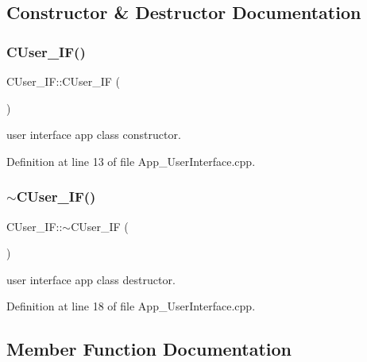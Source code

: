 \subsection{Constructor \& Destructor Documentation}
\mbox{\label{class_c_user___i_f_a417b492fc7368c7d5dde59587f4b3e65}} 
\subsubsection{\texorpdfstring{C\+User\+\_\+\+I\+F()}{CUser\_IF()}}
{\footnotesize\ttfamily C\+User\+\_\+\+I\+F\+::\+C\+User\+\_\+\+IF (\begin{DoxyParamCaption}{ }\end{DoxyParamCaption})}



user interface app class constructor. 



Definition at line 13 of file App\+\_\+\+User\+Interface.\+cpp.

\mbox{\label{class_c_user___i_f_a35f3408f44d101a06e184311cab14cba}} 
\subsubsection{\texorpdfstring{$\sim$\+C\+User\+\_\+\+I\+F()}{~CUser\_IF()}}
{\footnotesize\ttfamily C\+User\+\_\+\+I\+F\+::$\sim$\+C\+User\+\_\+\+IF (\begin{DoxyParamCaption}{ }\end{DoxyParamCaption})}



user interface app class destructor. 



Definition at line 18 of file App\+\_\+\+User\+Interface.\+cpp.



\subsection{Member Function Documentation}
\mbox{\label{class_c_user___i_f_a02c8bba754c77583dc5afaa6877dc547}} 

